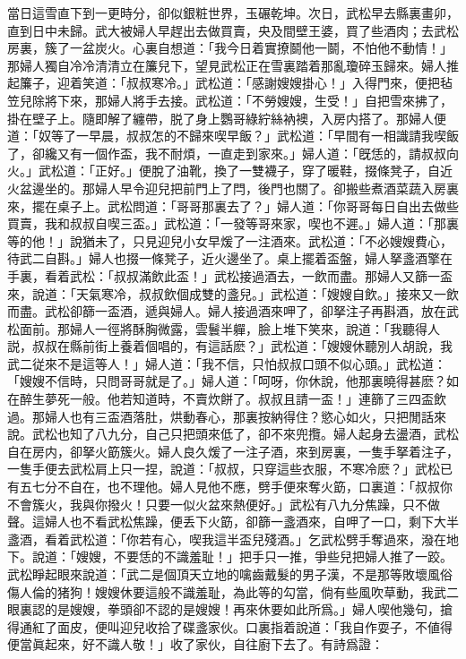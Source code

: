 當日這雪直下到一更時分，卻似銀粧世界，玉碾乾坤。次日，武松早去縣裏畫卯，直到日中未歸。武大被婦人早趕出去做買賣，央及間壁王婆，買了些酒肉；去武松房裏，簇了一盆炭火。心裏自想道：「我今日着實撩鬬他一鬬，不怕他不動情！」那婦人獨自冷冷清清立在簾兒下，望見武松正在雪裏踏着那亂瓊碎玉歸來。婦人推起簾子，迎着笑道：「叔叔寒冷。」武松道：「感謝嫂嫂掛心！」入得門來，便把毡笠兒除將下來，那婦人將手去接。武松道：「不勞嫂嫂，生受！」自把雪來拂了，掛在壁子上。隨即解了纏帶，脱了身上鸚哥綠紵絲衲襖，入房内搭了。那婦人便道：「奴等了一早晨，叔叔怎的不歸來喫早飯？」武松道：「早間有一相識請我喫飯了，卻纔又有一個作盃，我不耐煩，一直走到家來。」婦人道：「旣恁的，請叔叔向火。」武松道：「正好。」便脫了油靴，換了一雙襪子，穿了暖鞋，掇條凳子，自近火盆邊坐的。那婦人早令迎兒把前門上了閂，後門也關了。卻搬些煮酒菜蔬入房裏來，擺在桌子上。武松問道：「哥哥那裏去了？」婦人道：「你哥哥每日自出去做些買賣，我和叔叔自喫三盃。」武松道：「一發等哥來家，喫也不遲。」婦人道：「那裏等的他！」說猶未了，只見迎兒小女早煖了一注酒來。武松道：「不必嫂嫂費心，待武二自斟。」婦人也掇一條凳子，近火邊坐了。桌上擺着盃盤，婦人拏盞酒擎在手裏，看着武松：「叔叔滿飲此盃！」武松接過酒去，一飲而盡。那婦人又篩一盃來，說道：「天氣寒冷，叔叔飲個成雙的盞兒。」武松道：「嫂嫂自飲。」接來又一飲而盡。武松卻篩一盃酒，遞與婦人。婦人接過酒來呷了，卻拏注子再斟酒，放在武松面前。那婦人一徑將酥胸微露，雲鬟半軃，臉上堆下笑來，說道：「我聽得人説，叔叔在縣前街上養着個唱的，有這話麽？」武松道：「嫂嫂休聽別人胡說，我武二従來不是這等人！」婦人道：「我不信，只怕叔叔口頭不似心頭。」武松道：「嫂嫂不信時，只問哥哥就是了。」婦人道：「呵呀，你休說，他那裏曉得甚麽？如在醉生夢死一般。他若知道時，不賣炊餅了。叔叔且請一盃！」連篩了三四盃飲過。那婦人也有三盃酒落肚，烘動春心，那裏按納得住？慾心如火，只把閒話來說。武松也知了八九分，自己只把頭來低了，卻不來兜攬。婦人起身去盪酒，武松自在房内，卻拏火筯簇火。婦人良久煖了一注子酒，來到房裏，一隻手拏着注子，一隻手便去武松肩上只一捏，說道：「叔叔，只穿這些衣服，不寒冷麽？」武松已有五七分不自在，也不理他。婦人見他不應，劈手便來奪火筯，口裏道：「叔叔你不會簇火，我與你撥火！只要一似火盆來熱便好。」武松有八九分焦躁，只不做聲。這婦人也不看武松焦躁，便丢下火筯，卻篩一盞酒來，自呷了一口，剩下大半盞酒，看着武松道：「你若有心，喫我這半盃兒殘酒。」乞武松劈手奪過來，潑在地下。說道：「嫂嫂，不要恁的不識羞耻！」把手只一推，爭些兒把婦人推了一跤。武松睜起眼來說道：「武二是個頂天立地的噙齒戴髮的男子漢，不是那等敗壞風俗傷人倫的猪狗！嫂嫂休要這般不識羞耻，為此等的勾當，倘有些風吹草動，我武二眼裏認的是嫂嫂，拳頭卻不認的是嫂嫂！再來休要如此所爲。」婦人喫他幾句，搶得通紅了面皮，便叫迎兒收拾了碟盞家伙。口裏指着說道：「我自作耍子，不値得便當眞起來，好不識人敬！」收了家伙，自往廚下去了。有詩爲證：

